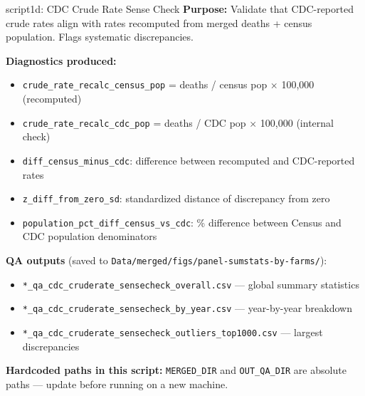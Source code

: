 \documentclass[aspectratio=169]{beamer}
\begin{document}
\begin{frame}{script1d: CDC Crude Rate Sense Check}
\textbf{Purpose:} Validate that CDC-reported crude rates align with rates recomputed from merged deaths + census population. Flags systematic discrepancies.

\vspace{0.3em}
\textbf{Diagnostics produced:}
\begin{itemize}\small
    \item \texttt{crude\_rate\_recalc\_census\_pop} = deaths / census pop $\times$ 100{,}000 (recomputed)
    \item \texttt{crude\_rate\_recalc\_cdc\_pop} = deaths / CDC pop $\times$ 100{,}000 (internal check)
    \item \texttt{diff\_census\_minus\_cdc}: difference between recomputed and CDC-reported rates
    \item \texttt{z\_diff\_from\_zero\_sd}: standardized distance of discrepancy from zero
    \item \texttt{population\_pct\_diff\_census\_vs\_cdc}: \% difference between Census and CDC population denominators
\end{itemize}

\vspace{0.3em}
\textbf{QA outputs} (saved to \texttt{Data/merged/figs/panel-sumstats-by-farms/}):
\begin{itemize}\small
    \item \texttt{*\_qa\_cdc\_cruderate\_sensecheck\_overall.csv} — global summary statistics
    \item \texttt{*\_qa\_cdc\_cruderate\_sensecheck\_by\_year.csv} — year-by-year breakdown
    \item \texttt{*\_qa\_cdc\_cruderate\_sensecheck\_outliers\_top1000.csv} — largest discrepancies
\end{itemize}

\vspace{0.3em}
{\small \textbf{Hardcoded paths in this script:} \texttt{MERGED\_DIR} and \texttt{OUT\_QA\_DIR} are absolute paths — update before running on a new machine.}
\end{frame}

\end{document}
